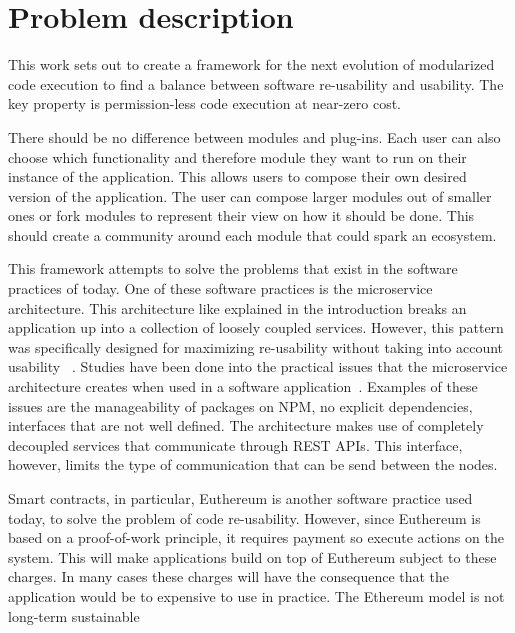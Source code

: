 \chapter{Problem description}


%

This work sets out to create a framework for the next evolution of modularized code execution to find a balance between software re-usability and usability. The key property is permission-less code execution at near-zero cost.

There should be no difference between modules and plug-ins. Each user can also choose which functionality and therefore module they want to run on their instance of the application. This allows users to compose their own desired version of the application. The user can compose larger modules out of smaller ones or fork modules to represent their view on how it should be done. This should create a community around each module that could spark an ecosystem.

This framework attempts to solve the problems that exist in the software practices of today. One of these software practices is the microservice architecture. This architecture like explained in the introduction breaks an application up into a collection of loosely coupled services. However, this pattern was specifically designed for maximizing re-usability without taking into account usability~\cite{newman2015building} . Studies have been done into the practical issues that the microservice architecture creates when used in a software application~\cite{dragoni2017microservices}. Examples of these issues are the manageability of packages on NPM, no explicit dependencies, interfaces that are not well defined. The architecture makes use of completely decoupled services that communicate through REST APIs. This interface, however, limits the type of communication that can be send between the nodes.

Smart contracts, in particular, Euthereum is another software practice used today, to solve the problem of code re-usability. However, since Euthereum is based on a proof-of-work principle, it requires payment so execute actions on the system. This will make applications build on top of Euthereum subject to these charges. In many cases these charges will have the consequence that the application would be to expensive to use in practice. The Ethereum model is not long-term sustainable

